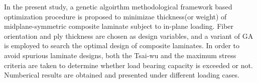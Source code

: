 In the present study,  a genetic algoirthm methodological framework based
optimization procedure is proposed to minimizae thickness(or weight) of
midplane-symmetric composite laminate subject to in-plane loading. Fiber
orientation and ply thickness are chosen as design variables, and a variant of GA is 
employed to search the optimal design of composite laminates.  In order to avoid
spurious laminate designs, both the Tsai-wu and the maximum stress criteria are
taken to determine whether load bearing capacity is exceeded or not. Numberical
results are obtained and presented under different loading cases.
